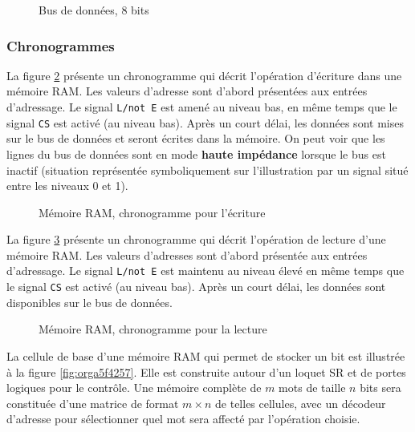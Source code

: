 \documentclass[11pt]{article}
\begin{document}
\begin{figure}[htbp]
\centering

\caption{\label{fig:orgfc7fcc1}Bus de données, 8 bits}
\end{figure}

\subsubsection{Chronogrammes}
\label{sec:org5fcf0d8}

La figure \ref{fig:orgf59212b} présente un chronogramme qui décrit
l'opération d'écriture dans une mémoire RAM. Les valeurs d'adresse
sont d'abord présentées aux entrées d'adressage.  Le signal \texttt{L/not E}
est amené au niveau bas, en même temps que le signal \texttt{CS} est activé
(au niveau bas). Après un court délai, les données sont mises sur le
bus de données et seront écrites dans la mémoire. On peut voir que les
lignes du bus de données sont en mode \textbf{haute impédance} lorsque le bus
est inactif (situation représentée symboliquement sur l'illustration
par un signal situé entre les niveaux 0 et 1).

\begin{figure}[htbp]
\centering

\caption{\label{fig:orgf59212b}Mémoire RAM, chronogramme pour l'écriture}
\end{figure}

La figure \ref{fig:org8bcf12a} présente un chronogramme qui décrit
l'opération de lecture d'une mémoire RAM. Les valeurs d'adresses sont
d'abord présentée aux entrées d'adressage.  Le signal \texttt{L/not E} est
maintenu au niveau élevé en même temps que le signal \texttt{CS} est activé
(au niveau bas). Après un court délai, les données sont disponibles sur
le bus de données.

\begin{figure}[htbp]
\centering

\caption{\label{fig:org8bcf12a}Mémoire RAM, chronogramme pour la lecture}
\end{figure}

La cellule de base d'une mémoire RAM qui permet de stocker un bit est
illustrée à la figure \ref{fig:orga5f4257}. Elle est construite autour d'un
loquet SR et de portes logiques pour le contrôle. Une mémoire complète
de \(m\) mots de taille \(n\) bits sera constituée d'une matrice de
format \(m \times n\) de telles cellules, avec un décodeur d'adresse
pour sélectionner quel mot sera affecté par l'opération choisie.
\end{document}
